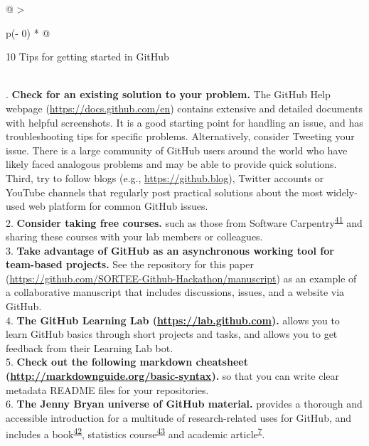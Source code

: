 \begin{tablenos:no-prefix-table-caption}

\begin{longtable}[]{@{}
  >{\raggedright\arraybackslash}p{(\columnwidth - 0\tabcolsep) * }@{}}
\toprule
\begin{minipage}[b]{\linewidth}\raggedright
10 Tips for getting started in GitHub
\end{minipage} \\
\midrule
{}. \textbf{Check for an existing solution to your problem.} The GitHub Help webpage (\url{https://docs.github.com/en}) contains extensive and detailed documents with helpful screenshots. It is a good starting point for handling an issue, and has troubleshooting tips for specific problems. Alternatively, consider Tweeting your issue. There is a large community of GitHub users around the world who have likely faced analogous problems and may be able to provide quick solutions. Third, try to follow blogs (e.g., \url{https://github.blog}), Twitter accounts or YouTube channels that regularly post practical solutions about the most widely-used web platform for common GitHub issues. \\
2. \textbf{Consider taking free courses.} such as those from Software Carpentry\textsuperscript{\protect\hyperlink{ref-pjy75gHr}{41}} and sharing these courses with your lab members or colleagues. \\
3. \textbf{Take advantage of GitHub as an asynchronous working tool for team-based projects.} See the repository for this paper (\url{https://github.com/SORTEE-Github-Hackathon/manuscript}) as an example of a collaborative manuscript that includes discussions, issues, and a website via GitHub. \\
4. \textbf{The GitHub Learning Lab (\url{https://lab.github.com}).} allows you to learn GitHub basics through short projects and tasks, and allows you to get feedback from their Learning Lab bot. \\
5. \textbf{Check out the following markdown cheatsheet (\url{http://markdownguide.org/basic-syntax}).} so that you can write clear metadata README files for your repositories. \\
6. \textbf{The Jenny Bryan universe of GitHub material.} provides a thorough and accessible introduction for a multitude of research-related uses for GitHub, and includes a book\textsuperscript{\protect\hyperlink{ref-ZvrOcg9w}{42}}, statistics course\textsuperscript{\protect\hyperlink{ref-6CMMeSeD}{43}} and academic article\textsuperscript{\protect\hyperlink{ref-RVetqmsg}{7}}. \\

\end{longtable}
\end{tablenos:no-prefix-table-caption}
